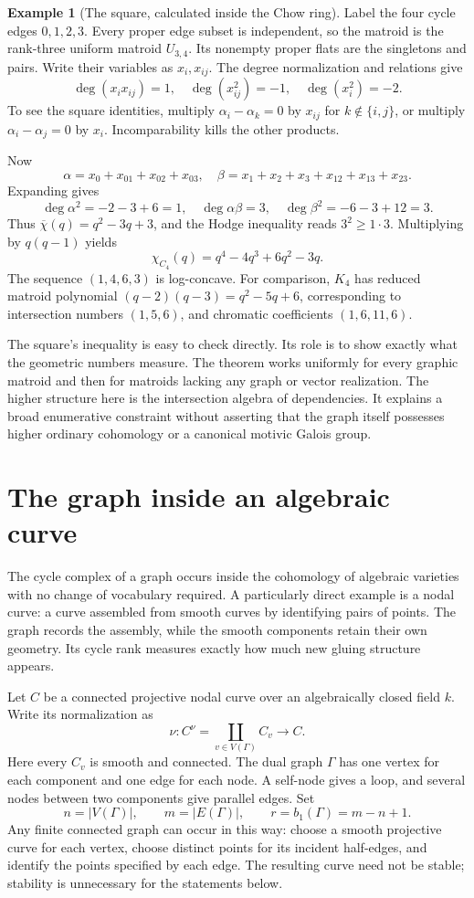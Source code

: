 \documentclass[11pt]{article}
\theoremstyle{definition}
\newtheorem{example}[theorem]{Example}
\theoremstyle{remark}
\begin{document}
\begin{example}[The square, calculated inside the Chow ring]\label{ex:gmh-c4}
Label the four cycle edges $0,1,2,3$. Every proper edge subset is independent, so the matroid is the rank-three uniform matroid $U_{3,4}$. Its nonempty proper flats are the singletons and pairs. Write their variables as $x_i,x_{ij}$. The degree normalization and relations give
\[
 \deg(x_ix_{ij})=1,
 \quad\deg(x_{ij}^2)=-1,
 \quad\deg(x_i^2)=-2.
\]
To see the square identities, multiply $\alpha_i-\alpha_k=0$ by $x_{ij}$ for $k\notin\{i,j\}$, or multiply $\alpha_i-\alpha_j=0$ by $x_i$. Incomparability kills the other products.

Now
\[
 \alpha=x_0+x_{01}+x_{02}+x_{03},
 \quad
 \beta=x_1+x_2+x_3+x_{12}+x_{13}+x_{23}.
\]
Expanding gives
\[
 \deg\alpha^2=-2-3+6=1,
 \quad\deg\alpha\beta=3,
 \quad\deg\beta^2=-6-3+12=3.
\]
Thus $\overline\chi(q)=q^2-3q+3$, and the Hodge inequality reads $3^2\ge1\cdot3$. Multiplying by $q(q-1)$ yields
\[
 \chi_{C_4}(q)=q^4-4q^3+6q^2-3q.
\]
The sequence $(1,4,6,3)$ is log-concave. For comparison, $K_4$ has reduced matroid polynomial $(q-2)(q-3)=q^2-5q+6$, corresponding to intersection numbers $(1,5,6)$, and chromatic coefficients $(1,6,11,6)$.
\end{example}

The square's inequality is easy to check directly. Its role is to show exactly what the geometric numbers measure. The theorem works uniformly for every graphic matroid and then for matroids lacking any graph or vector realization. The higher structure here is the intersection algebra of dependencies. It explains a broad enumerative constraint without asserting that the graph itself possesses higher ordinary cohomology or a canonical motivic Galois group.


\section{The graph inside an algebraic curve}
\label{sec:graph-inside-curve}

The cycle complex of a graph occurs inside the cohomology of algebraic
varieties with no change of vocabulary required.  A particularly direct
example is a nodal curve: a curve assembled from smooth curves by identifying
pairs of points.  The graph records the assembly, while the smooth components
retain their own geometry.  Its cycle rank measures exactly how much new
gluing structure appears.

Let $C$ be a connected projective nodal curve over an algebraically closed
field $k$.  Write its normalization as
\[
  \nu:C^\nu=\coprod_{v\in V(\Gamma)}C_v\longrightarrow C.
\]
Here every $C_v$ is smooth and connected.  The dual graph $\Gamma$ has one
vertex for each component and one edge for each node.  A self-node gives a
loop, and several nodes between two components give parallel edges.  Set
\[
  n=|V(\Gamma)|,\qquad m=|E(\Gamma)|,\qquad
  r=b_1(\Gamma)=m-n+1.
\]
Any finite connected graph can occur in this way: choose a smooth projective
curve for each vertex, choose distinct points for its incident half-edges,
and identify the points specified by each edge.  The resulting curve need
not be stable; stability is unnecessary for the statements below.
\end{document}
